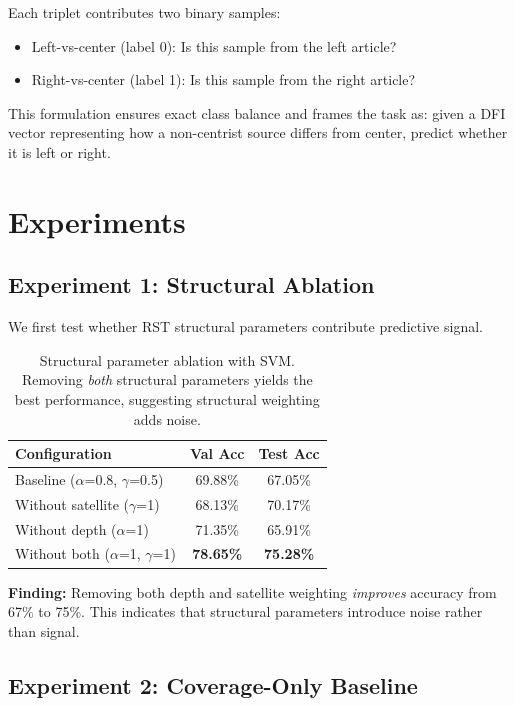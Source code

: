 \documentclass[11pt]{article}
\begin{document}
Each triplet contributes two binary samples:
\begin{itemize}
    \item Left-vs-center (label 0): Is this sample from the left article?
    \item Right-vs-center (label 1): Is this sample from the right article?
\end{itemize}

This formulation ensures exact class balance and frames the task as: given a DFI vector representing how a non-centrist source differs from center, predict whether it is left or right.


\section{Experiments}

\subsection{Experiment 1: Structural Ablation}

We first test whether RST structural parameters contribute predictive signal.

\begin{table}[h]
\centering
\small
\begin{tabular}{lcc}
\toprule
\textbf{Configuration} & \textbf{Val Acc} & \textbf{Test Acc} \\
\midrule
Baseline ($\alpha$=0.8, $\gamma$=0.5) & 69.88\% & 67.05\% \\
Without satellite ($\gamma$=1) & 68.13\% & 70.17\% \\
Without depth ($\alpha$=1) & 71.35\% & 65.91\% \\
Without both ($\alpha$=1, $\gamma$=1) & \textbf{78.65\%} & \textbf{75.28\%} \\
\bottomrule
\end{tabular}
\caption{Structural parameter ablation with SVM. Removing \emph{both} structural parameters yields the best performance, suggesting structural weighting adds noise.}
\label{tab:structural_ablation}
\end{table}

\textbf{Finding:} Removing both depth and satellite weighting \emph{improves} accuracy from 67\% to 75\%. This indicates that structural parameters introduce noise rather than signal.

\subsection{Experiment 2: Coverage-Only Baseline}
\end{document}
